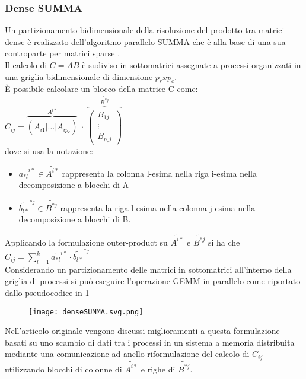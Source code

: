 \subsubsection{Dense SUMMA} %
Un partizionamento bidimensionale della risoluzione del prodotto tra matrici
dense è realizzato dell'algoritmo parallelo SUMMA \parencite{denseSumma} che è alla
base di una sua controparte per matrici sparse \parencite{sparseSUMMA}.\\
Il calcolo di $C=AB$ è sudiviso in sottomatrici assegnate a processi organizzati 
in una griglia bidimensionale di dimensione  $p_r x p_c$.\\
È possibile calcolare un blocco della matrice C come:
$C_{ij} =  \overbrace{\left(  A_{i1} | \dots |  A_{ip_c} \right)}^{\tilde{A^{i*}} }
~\cdot~ \overbrace{\left( 
        \begin{array}{c} B_{1j} \\ \vdots \\  B_{p_r j}
        \end{array} \right)} ^{\tilde{B^{*j}}} $\\
dove si usa la notazione:
\begin{itemize}
  \item $\tilde{a_{*l}}^{i*} \in \tilde{ A^{i*}}$ rappresenta 
    la colonna l-esima nella riga i-esima nella decomposizione a blocchi di A
  \item $\tilde{b_{l*}}^{*j} \in  \tilde{B^{*j}}$ rappresenta 
    la riga l-esima nella colonna j-esima nella decomposizione a blocchi di B.
\end{itemize}  
Applicando la formulazione outer-product su $\tilde{ A^{i*}}$ e $\tilde{B^{*j}}$
si ha che $C_{ij}=\sum\limits_{l=1}^{k}\tilde{a_{*l}}^{i*} \cdot \tilde{b_{l*}}^{*j}$\\
Considerando un partizionamento delle matrici in sottomatrici all'interno della
griglia di processi %
si può eseguire l'operazione GEMM in parallelo come riportato dallo pseudocodice
in \ref{figCode:denseSUMMA}\\
\begin{figure}[h]
  \centering \texttt{[image: denseSUMMA.svg.png]}
  \caption[esecuzione dense SUMMA sul processo $P_{ij}$] \decoRule \label{figCode:denseSUMMA}
\end{figure}
Nell'articolo originale vengono discussi miglioramenti a questa formulazione
basati su uno scambio di dati tra i processi in un sistema a memoria distribuita
mediante una comunicazione ad anello 
riformulazione del calcolo di $C_{ij}$ utilizzando blocchi di
colonne di $\tilde{ A^{i*}}$ e righe di $\tilde{B^{*j}}$.\\

